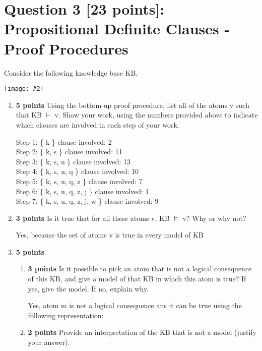 \documentclass{article}
\def\ans#1{{\color{ans}#1}}
\newcommand{\centerfig}[2]{\begin{center}\texttt{[image: \#2]}\end{center}}
\begin{document}
\clearpage
\section{Question 3 [23 points]: Propositional Definite Clauses - Proof Procedures}
Consider the following knowledge base KB.
\centerfig{0.2}{../figs/fig2}
\begin{enumerate}[label=(\alph*)]
    \item \textbf{5 points} Using the bottom-up proof procedure, list all of the atoms v such that KB $\vdash$ v. Show your work, using the numbers provided above to indicate which clauses are involved in each step of your work.
    
         \ans{
          Step 1:  \{ k \}  clause involved: 2 \\
          Step 2:  \{ k, s \}  clause involved: 11 \\
          Step 3:  \{ k, s, u \}  clause involved: 13 \\
          Step 4:  \{ k, s, u, q \}  clause involved: 10 \\
          Step 5:  \{ k, s, u, q, z \}  clause involved: 7 \\
          Step 6:  \{ k, s, u, q, z, j \}  clause involved: 1 \\
          Step 7:  \{ k, s, u, q, z, j, w \}  clause involved: 9 
      }  \\
    
    \item \textbf{3 points} Is it true that for all these atoms v, KB $\vDash$ v? Why or why not?
    
         \ans{
          Yes, because the set of atoms v is true in every model of KB
      }  \\
    
    \item \textbf{5 points}
    \begin{enumerate}[label=\roman*.]
        \item \textbf{3 points} Is it possible to pick an atom that is not a logical consequence of this KB, and give a model of that KB in which this atom is true? If yes, give the model. If no, explain why.
        
        \ans{
          Yes, atom m is not a logical consequence ans it can be true using the following representation:
      }  \\
        
        
        \item \textbf{2 points} Provide an interpretation of the KB that is not a model (justify your answer).
        

\end{enumerate}
\end{enumerate}
\end{document}
